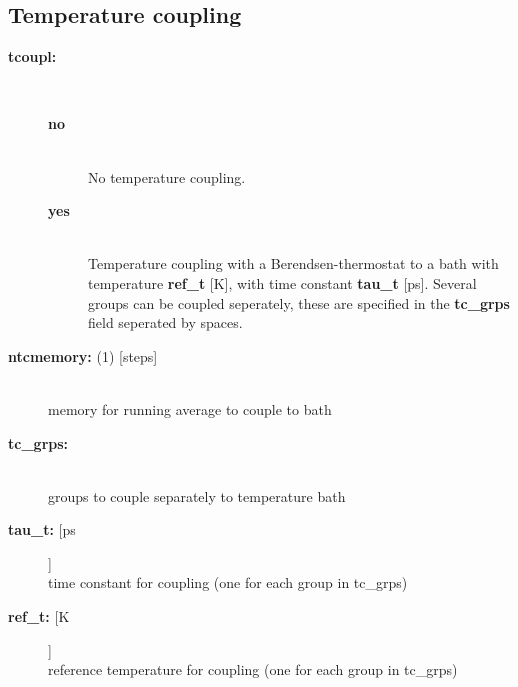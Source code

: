 \subsection{Temperature coupling}
\begin{description}
\item[{\bf tcoupl:}]\mbox{}\\
\vspace{-2ex}\begin{description}
\item[{\bf no}]\mbox{}\\
No temperature coupling. 
\item[{\bf yes}]\mbox{}\\
Temperature coupling with a Berendsen-thermostat to a bath with
temperature {\bf ref\_t} [K], with time constant {\bf tau\_t} [ps].
Several groups can be coupled seperately, these are specified in the
{\bf tc\_grps} field seperated by spaces.
\end{description}
\item[{\bf ntcmemory: }(1) {[steps]}]\mbox{}\\
memory for running average to couple to bath
\item[{\bf tc\_grps:}]\mbox{}\\
groups to couple separately to temperature bath
\item[{\bf tau\_t: }[ps]]\mbox{}\\
time constant for coupling (one for each group in tc\_grps)
\item[{\bf ref\_t: }[K]]\mbox{}\\
reference temperature for coupling (one for each group in tc\_grps)
\end{description}


